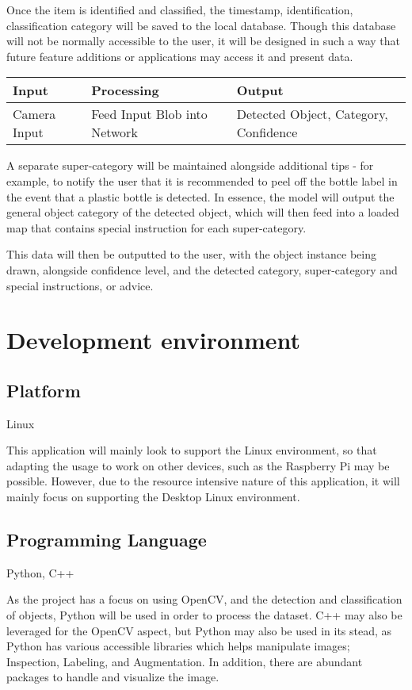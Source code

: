 \documentclass[conference]{IEEEtran}
\begin{document}
Once the item is identified and classified, the timestamp, identification, classification category will be saved to the local database. Though this database will not be normally accessible to the user, it will be designed in such a way that future feature additions or applications may access it and present data.

\begin{table}[htbp]
    \begin{tabular}{|p{2cm}|p{2.9cm}|p{2.9cm}|}
    \hline
    \textbf{Input} & \textbf{Processing} & \textbf{Output}\\ \hline
    Camera Input & Feed Input Blob into Network & Detected Object, Category, Confidence \\ \hline
    \end{tabular}
\end{table}

A separate super-category will be maintained alongside additional tips - for example, to notify the user that it is recommended to peel off the bottle label in the event that a plastic bottle is detected. In essence, the model will output the general object category of the detected object, which will then feed into a loaded map that contains special instruction for each super-category.

This data will then be outputted to the user, with the object instance being drawn, alongside confidence level, and the detected category, super-category and special instructions, or advice.

\newpage
\section{Development environment}
\subsection{Platform}
\begin{center}
    Linux
\end{center}
This application will mainly look to support the Linux environment, so that adapting the usage to work on other devices, such as the Raspberry Pi may be possible. However, due to the resource intensive nature of this application, it will mainly focus on supporting the Desktop Linux environment.

\subsection{Programming Language}
\begin{center}
Python, C++
\end{center}
As the project has a focus on using OpenCV, and the detection and classification of objects, Python will be used in order to process the dataset. C++ may also be leveraged for the OpenCV aspect, but Python may also be used in its stead, as Python has various accessible libraries which helps manipulate images; Inspection, Labeling, and Augmentation. In addition, there are abundant packages to handle and visualize the image.
\end{document}
